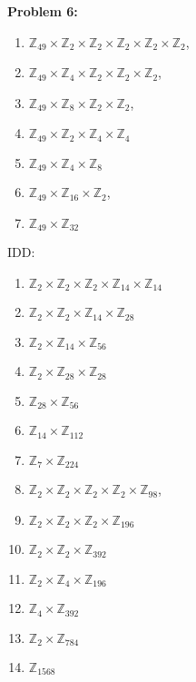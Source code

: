 \documentclass[12pt, letterpaper]{article}
\newenvironment{problem}
    [1]
    {\noindent \textbf{Problem #1:}}
    {\vspace{3mm}}
\begin{document}
\begin{problem}{6}
\begin{enumerate}[(a)]
\begin{enumerate}[1.]
            \item $\mathbb{Z}_{49} \times \mathbb{Z}_2 \times \mathbb{Z}_2 
                \times \mathbb{Z}_2 \times \mathbb{Z}_2 \times \mathbb{Z}_2$,
            \item $\mathbb{Z}_{49} \times \mathbb{Z}_4 \times \mathbb{Z}_2 
                \times \mathbb{Z}_2 \times \mathbb{Z}_2$,
            \item $\mathbb{Z}_{49} \times \mathbb{Z}_8 \times \mathbb{Z}_2 
                \times \mathbb{Z}_2$,
            \item $\mathbb{Z}_{49} \times \mathbb{Z}_2 \times \mathbb{Z}_4 \times \mathbb{Z}_4$
            \item $\mathbb{Z}_{49} \times \mathbb{Z}_4 \times \mathbb{Z}_8$
            \item $\mathbb{Z}_{49} \times \mathbb{Z}_{16} \times \mathbb{Z}_2$,
            \item $\mathbb{Z}_{49} \times \mathbb{Z}_{32}$
        \end{enumerate}
        
        IDD:
        \begin{enumerate}[1.]
            \item $\mathbb{Z}_2 \times \mathbb{Z}_2 \times \mathbb{Z}_2 \times \mathbb{Z}_{14}
                \times \mathbb{Z}_{14}$
            \item $\mathbb{Z}_2 \times \mathbb{Z}_2 \times \mathbb{Z}_{14} \times \mathbb{Z}_{28}$
            \item $\mathbb{Z}_{2} \times \mathbb{Z}_{14} \times \mathbb{Z}_{56}$
            
            \item $\mathbb{Z}_2 \times \mathbb{Z}_{28} \times \mathbb{Z}_{28}$
            \item $\mathbb{Z}_{28} \times \mathbb{Z}_{56}$

            \item $\mathbb{Z}_{14} \times \mathbb{Z}_{112}$
            \item $\mathbb{Z}_7 \times \mathbb{Z}_{224}$
            
            \item $\mathbb{Z}_2 \times \mathbb{Z}_2 \times \mathbb{Z}_2 \times \mathbb{Z}_2 
                \times \mathbb{Z}_{98}$,
            \item $\mathbb{Z}_2 \times \mathbb{Z}_2 \times \mathbb{Z}_2 \times \mathbb{Z}_{196}$
            \item $\mathbb{Z}_2 \times \mathbb{Z}_2 \times \mathbb{Z}_{392}$
            
            \item $\mathbb{Z}_2 \times \mathbb{Z}_4 \times \mathbb{Z}_{196}$
            \item $\mathbb{Z}_4 \times \mathbb{Z}_{392}$

            \item $\mathbb{Z}_2 \times \mathbb{Z}_{784}$
            \item $\mathbb{Z}_{1568}$
        \end{enumerate}

    \end{enumerate}
\end{problem}
\end{document}
